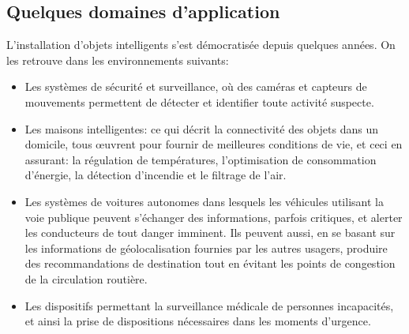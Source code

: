 \subsection{Quelques domaines d'application}
L'installation d'objets intelligents s'est démocratisée depuis quelques années. On les retrouve dans les environnements suivants:
\begin{itemize}
  \item Les systèmes de sécurité et surveillance, où des caméras et capteurs de mouvements permettent de détecter et identifier toute activité suspecte.
  \item Les maisons intelligentes: ce qui décrit la connectivité des objets dans un domicile, tous œuvrent pour fournir de meilleures conditions de vie, et ceci en assurant: la régulation de températures, l'optimisation de consommation d'énergie, la détection d'incendie et le filtrage de l'air.
  \item Les systèmes de voitures autonomes dans lesquels les véhicules utilisant la voie publique peuvent s'échanger des informations, parfois critiques, et alerter les conducteurs de tout danger imminent. Ils peuvent aussi, en se basant sur les informations de géolocalisation fournies par les autres usagers, produire des recommandations de destination tout en évitant les points de congestion de la circulation routière.
  \item Les dispositifs permettant la surveillance médicale de personnes incapacités, et ainsi la prise de dispositions nécessaires dans les moments d'urgence.
\end{itemize}

